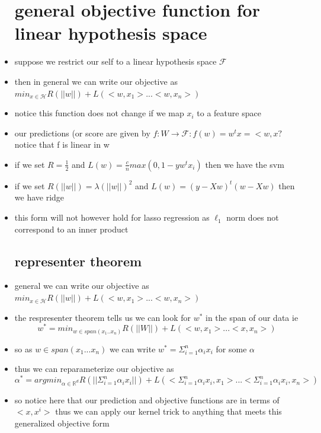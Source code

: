 \documentclass{article}
\begin{document}
\begin{itemize}
\section{general objective function for linear hypothesis space }
\item suppose we restrict our self to a linear hypothesis space $\mathcal{F}$
\item then in general we can write our objective as $min_{x\in \mathcal{H}}R(||w||)+L(<w,x_1>...<w,x_n>)$
\item notice this function does not change if we map $x_i$ to a feature space
\item our predictions (or score are given by $f:W\rightarrow \mathcal{F}:f(w)=w^{t}x=<w,x?$ notice that f is linear in w 
\item if we set $R=\frac{1}{2}$ and $L(w)=\frac{c}{n}max(0,1-yw^tx_i)$ then we have the svm 
\item if we set $R(||w||)=\lambda(||w||)^{2}$ and $L(w)=(y-Xw)^{t}(w-Xw)$ then we have ridge 
\item this form will not however hold for lasso regression as $\ell_{1}$ norm does not correspond to an inner product 
\subsection{representer theorem}
\item general we can write our objective as $min_{x\in \mathcal{H}}R(||w||)+L(<w,x_1>...<w,x_n>)$
\item the respresenter theorem tells us we can look for $w^{*}$ in the span of our data ie $$w^{*}=min_{w\in span(x_1..x_n)}R(||W||)+L(<w,x_1>...<x,x_n>)$$
\item so as $w\in span(x_1...x_n)$ we can write $w^{*}=\Sigma_{i=1}^{n}\alpha_ix_i$ for some $\alpha$
\item thus we can reparameterize  our objective as $$\alpha^{*}=argmin_{\alpha\in\mathbb{R}^d}R(||\Sigma_{i=1}^{n}\alpha_ix_i||)+L(<\Sigma_{i=1}^{n}\alpha_ix_i,x_1>...<\Sigma_{i=1}^{n}\alpha_ix_i,x_n>)$$
\item so notice here that our prediction and objective functions are in terms of $<x,x^{i}>$ thus we can apply our kernel trick to anything that meets this generalized objective form 

\end{itemize}
\end{document}
